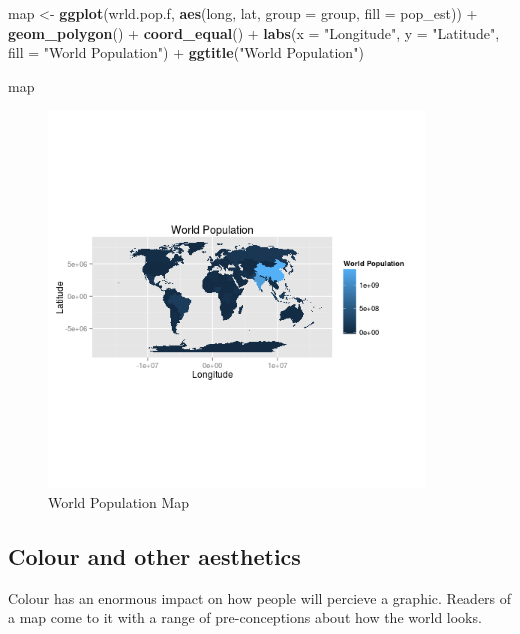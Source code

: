 \documentclass[]{article}
\newenvironment{Shaded}{}{}
\newcommand{\KeywordTok}[1]{\textcolor[rgb]{0.00,0.44,0.13}{\textbf{{#1}}}}
\newcommand{\DataTypeTok}[1]{\textcolor[rgb]{0.56,0.13,0.00}{{#1}}}
\newcommand{\StringTok}[1]{\textcolor[rgb]{0.25,0.44,0.63}{{#1}}}
\newcommand{\NormalTok}[1]{{#1}}
\let\Oldincludegraphics\includegraphics
\renewcommand{\includegraphics}[1]{\Oldincludegraphics[width=10cm]{#1}}
\begin{document}
\begin{Shaded}
\begin{Highlighting}[]
\NormalTok{map <- }\KeywordTok{ggplot}\NormalTok{(wrld.pop.f, }\KeywordTok{aes}\NormalTok{(long, lat, }\DataTypeTok{group =} \NormalTok{group, }\DataTypeTok{fill =} \NormalTok{pop_est)) + }\KeywordTok{geom_polygon}\NormalTok{() + }
    \KeywordTok{coord_equal}\NormalTok{() + }\KeywordTok{labs}\NormalTok{(}\DataTypeTok{x =} \StringTok{"Longitude"}\NormalTok{, }\DataTypeTok{y =} \StringTok{"Latitude"}\NormalTok{, }\DataTypeTok{fill =} \StringTok{"World Population"}\NormalTok{) + }
    \KeywordTok{ggtitle}\NormalTok{(}\StringTok{"World Population"}\NormalTok{)}

\NormalTok{map}
\end{Highlighting}
\end{Shaded}
\begin{figure}[htbp]
\centering
\includegraphics{figure/World_Population_Map.png}
\caption{World Population Map}
\end{figure}

\subsection{Colour and other aesthetics}

Colour has an enormous impact on how people will percieve a graphic.
Readers of a map come to it with a range of pre-conceptions about how
the world looks.
\end{document}
